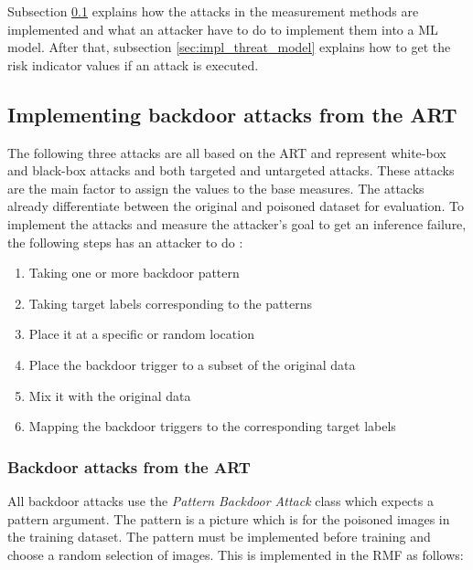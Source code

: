 Subsection \ref{sec:impl_backdoor_attacks} explains how the attacks in the measurement methods are implemented and what an attacker have to do to implement them into a ML model. After that, subsection \ref{sec:impl_threat_model} explains how to get the risk indicator values if an attack is executed.

\subsection{Implementing backdoor attacks from the ART}
\label{sec:impl_backdoor_attacks}

The following three attacks are all based on the ART \cite{art2018} and represent white-box and black-box attacks and both targeted and untargeted attacks. These attacks are the main factor to assign the values to the base measures. The attacks already differentiate between the original and poisoned dataset for evaluation. To implement the attacks and measure the attacker's goal to get an inference failure, the following steps has an attacker to do \cite{DBLP:journals/corr/abs-2003-03675}: \\

\begin{enumerate}
  \item Taking one or more backdoor pattern
  \item Taking target labels corresponding to the patterns
  \item Place it at a specific or random location
  \item Place the backdoor trigger to a subset of the original data
  \item Mix it with the original data
  \item Mapping the backdoor triggers to the corresponding target labels
\end{enumerate}

\subsubsection*{Backdoor attacks from the ART}
\label{sec:backdoors_art}

All backdoor attacks use the \textit{Pattern Backdoor Attack} \cite{DBLP:journals/corr/abs-1708-06733} class which expects a pattern argument. The pattern is a picture which is for the poisoned images in the training dataset. The pattern must be implemented before training and choose a random selection of images. This is implemented in the RMF as follows:


